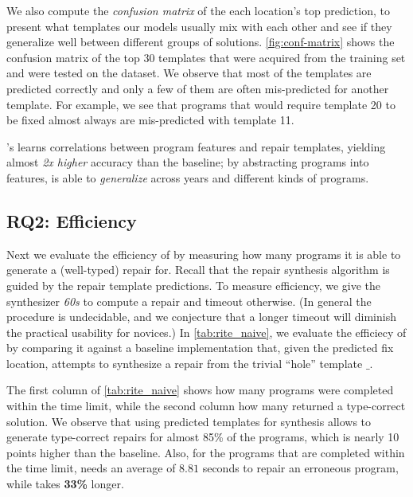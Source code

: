 %
We also compute the \emph{confusion matrix} of the each location's top
prediction, to present what templates our models usually mix with each other and
see if they generalize well between different groups of solutions.
%
\autoref{fig:conf-matrix} shows the confusion matrix of the top 30 templates
that were acquired from the training set and were tested on the \FALL dataset.
%
We observe that most of the templates are predicted correctly and only a few of
them are often mis-predicted for another template.
%
For example, we see that programs that would require template 20 to be fixed
almost always are mis-predicted with template 11.


\begin{framed}
  \noindent \toolname's learns correlations between program features and repair
  templates, yielding almost \emph{2x higher} accuracy than the baseline; by
  abstracting programs into features, \toolname is able to \emph{generalize}
  across years and different kinds of programs.
\end{framed}


\subsection{RQ2: Efficiency}
\label{sec:eval:efficiency}
\label{subsec:eval:man_rep_qual_eval}

Next we evaluate the efficiency of \toolname by measuring how many
programs it is able to generate a (well-typed) repair for.
%
Recall that the repair synthesis algorithm is guided by the
repair template predictions.
%
To measure efficiency, we give the synthesizer \emph{60s} to
compute a repair and timeout otherwise. (In general the procedure
is undecidable, and we conjecture that a longer timeout will diminish
the practical usability for novices.)
%
In \autoref{tab:rite_naive}, we evaluate the efficiecy of \toolname
by comparing it against a baseline \naive implementation that, given
the predicted fix location, attempts to synthesize a repair from the
trivial ``hole'' template $\_$.

The first column of \autoref{tab:rite_naive} shows how many
programs were completed within the time limit, while the second
column how many returned a type-correct solution.
%
We observe that using predicted templates for synthesis allows
\toolname to generate type-correct repairs for almost 85\% of
the programs, which is nearly 10 points higher than the \naive
baseline. Also, for the programs that are completed within
the time limit, \toolname needs an average of $8.81$ seconds
to repair an erroneous program, while \naive takes
\textbf{33\%} longer.

